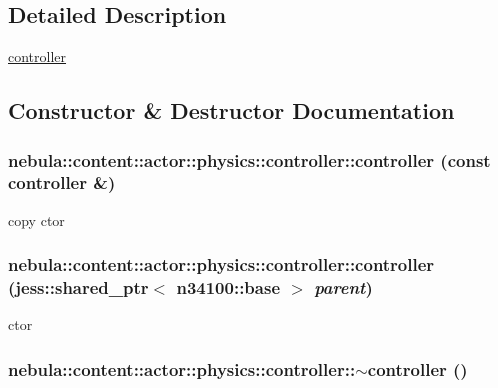\subsection{Detailed Description}
\hyperlink{classnebula_1_1content_1_1actor_1_1physics_1_1controller}{controller} 

\subsection{Constructor \& Destructor Documentation}
\hypertarget{classnebula_1_1content_1_1actor_1_1physics_1_1controller_acea67f469fce95ed2a27fe062aea026a}{
\subsubsection[{controller}]{\setlength{\rightskip}{0pt plus 5cm}nebula::content::actor::physics::controller::controller (const {\bf controller} \&)}}
\label{classnebula_1_1content_1_1actor_1_1physics_1_1controller_acea67f469fce95ed2a27fe062aea026a}


copy ctor \hypertarget{classnebula_1_1content_1_1actor_1_1physics_1_1controller_a1342ed6f004a13a9d1c9f611e222894b}{
\subsubsection[{controller}]{\setlength{\rightskip}{0pt plus 5cm}nebula::content::actor::physics::controller::controller (jess::shared\_\-ptr$<$ {\bf n34100::base} $>$ {\em parent})}}
\label{classnebula_1_1content_1_1actor_1_1physics_1_1controller_a1342ed6f004a13a9d1c9f611e222894b}


ctor \hypertarget{classnebula_1_1content_1_1actor_1_1physics_1_1controller_ae2e6459aa8fafd45c7a1f18a1906d418}{
\subsubsection[{$\sim$controller}]{\setlength{\rightskip}{0pt plus 5cm}nebula::content::actor::physics::controller::$\sim$controller ()}}
\label{classnebula_1_1content_1_1actor_1_1physics_1_1controller_ae2e6459aa8fafd45c7a1f18a1906d418}


